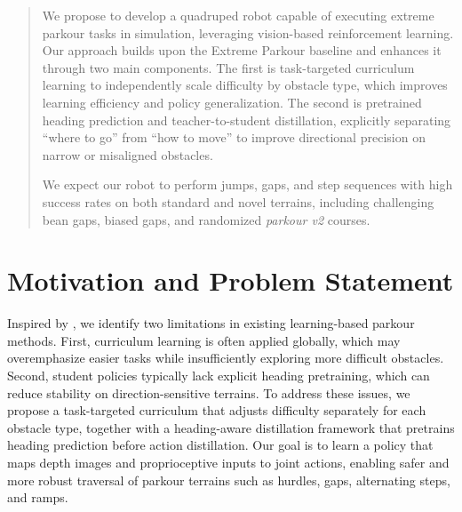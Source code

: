 \documentclass[conference]{IEEEtran}
\begin{document}
\begin{CJK}{UTF8}{gbsn}
\maketitle

\begin{abstract}
  We propose to develop a quadruped robot capable of executing extreme parkour tasks in simulation, leveraging vision-based reinforcement learning. Our approach builds upon the Extreme Parkour baseline and enhances it through two main components. The first is task-targeted curriculum learning to independently scale difficulty by obstacle type, which improves learning efficiency and policy generalization. The second is pretrained heading prediction and teacher-to-student distillation, explicitly separating “where to go” from “how to move” to improve directional precision on narrow or misaligned obstacles.

\setlength{\parindent}{2em}  We expect our robot to perform jumps, gaps, and step sequences with high success rates on both standard and novel terrains, including challenging bean gaps, biased gaps, and randomized \textit{parkour v2 }courses.
\end{abstract}

\IEEEpeerreviewmaketitle

\section{Motivation and Problem Statement}

Inspired by \citet{cheng2024extreme}, we identify two limitations in existing learning-based parkour methods. First, curriculum learning is often applied globally, which may overemphasize easier tasks while insufficiently exploring more difficult obstacles. Second, student policies typically lack explicit heading pretraining, which can reduce stability on direction-sensitive terrains. To address these issues, we propose a task-targeted curriculum that adjusts difficulty separately for each obstacle type, together with a heading-aware distillation framework that pretrains heading prediction before action distillation. Our goal is to learn a policy that maps depth images and proprioceptive inputs to joint actions, enabling safer and more robust traversal of parkour terrains such as hurdles, gaps, alternating steps, and ramps.



\end{CJK}
\end{document}
